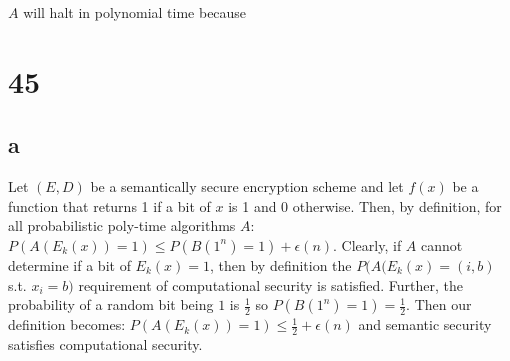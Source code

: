 \documentclass[letterpaper,notitlepage,twoside]{article}
\begin{document}
$A$ will halt in polynomial time because \\

\section*{45}
\subsection*{a}
Let $(E, D)$ be a semantically secure encryption scheme and let $f(x)$ be a function that returns 1 if a bit of $x$ is 1 and 0 otherwise.
Then, by definition, for all probabilistic poly-time algorithms $A$: $P(A(E_k(x)) = 1) \leq P(B(1^{n}) = 1) + \epsilon(n)$.
Clearly, if $A$ cannot determine if a bit of $E_k(x) = 1$, then by definition the $P(A(E_k(x) = (i,b)$ s.t. $x_i = b)$ requirement of computational security is satisfied. 
Further, the probability of a random bit being $1$ is $\frac{1}{2}$ so $P(B(1^{n}) = 1) = \frac{1}{2}$. 
Then our definition becomes: $P(A(E_k(x)) = 1) \leq \frac{1}{2} + \epsilon(n)$ and semantic security satisfies computational security.
\end{document}
